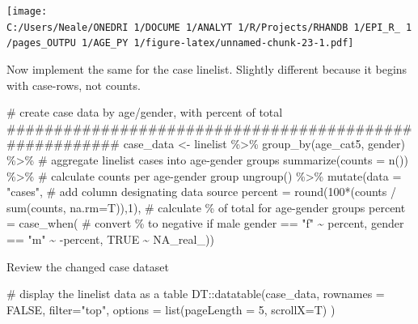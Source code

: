 \documentclass[
]{article}
\newenvironment{Shaded}{\begin{snugshade}}{\end{snugshade}}
\newcommand{\CommentTok}[1]{\textcolor[rgb]{0.50,0.62,0.50}{#1}}
\newcommand{\DataTypeTok}[1]{\textcolor[rgb]{0.87,0.87,0.75}{#1}}
\newcommand{\DecValTok}[1]{\textcolor[rgb]{0.86,0.86,0.80}{#1}}
\newcommand{\KeywordTok}[1]{\textcolor[rgb]{0.94,0.87,0.69}{#1}}
\newcommand{\NormalTok}[1]{\textcolor[rgb]{0.80,0.80,0.80}{#1}}
\newcommand{\OperatorTok}[1]{\textcolor[rgb]{0.94,0.94,0.82}{#1}}
\newcommand{\OtherTok}[1]{\textcolor[rgb]{0.94,0.94,0.56}{#1}}
\newcommand{\StringTok}[1]{\textcolor[rgb]{0.80,0.58,0.58}{#1}}
\begin{document}
\texttt{[image: C:/Users/Neale/ONEDRI~1/DOCUME~1/ANALYT~1/R/Projects/RHANDB~1/EPI\_R\_~1/pages\_OUTPU~1/AGE\_PY~1/figure-latex/unnamed-chunk-23-1.pdf]}

Now implement the same for the case linelist. Slightly different because
it begins with case-rows, not counts.

\begin{Shaded}
\begin{Highlighting}[]
\CommentTok{\# create case data by age/gender, with percent of total}
\CommentTok{\#\#\#\#\#\#\#\#\#\#\#\#\#\#\#\#\#\#\#\#\#\#\#\#\#\#\#\#\#\#\#\#\#\#\#\#\#\#\#\#\#\#\#\#\#\#\#\#\#\#\#\#\#\#\#}
\NormalTok{case\_data \textless{}{-}}\StringTok{ }\NormalTok{linelist }\OperatorTok{\%\textgreater{}\%}
\StringTok{  }\KeywordTok{group\_by}\NormalTok{(age\_cat5, gender) }\OperatorTok{\%\textgreater{}\%}\StringTok{  }\CommentTok{\# aggregate linelist cases into age{-}gender groups}
\StringTok{  }\KeywordTok{summarize}\NormalTok{(}\DataTypeTok{counts =} \KeywordTok{n}\NormalTok{()) }\OperatorTok{\%\textgreater{}\%}\StringTok{     }\CommentTok{\# calculate counts per age{-}gender group}
\StringTok{  }\KeywordTok{ungroup}\NormalTok{() }\OperatorTok{\%\textgreater{}\%}\StringTok{ }
\StringTok{  }\KeywordTok{mutate}\NormalTok{(}\DataTypeTok{data =} \StringTok{"cases"}\NormalTok{,                                          }\CommentTok{\# add column designating data source}
         \DataTypeTok{percent =} \KeywordTok{round}\NormalTok{(}\DecValTok{100}\OperatorTok{*}\NormalTok{(counts }\OperatorTok{/}\StringTok{ }\KeywordTok{sum}\NormalTok{(counts, }\DataTypeTok{na.rm=}\NormalTok{T)),}\DecValTok{1}\NormalTok{),  }\CommentTok{\# calculate \% of total for age{-}gender groups}
         \DataTypeTok{percent =} \KeywordTok{case\_when}\NormalTok{(                                     }\CommentTok{\# convert \% to negative if male}
\NormalTok{            gender }\OperatorTok{==}\StringTok{ "f"} \OperatorTok{\textasciitilde{}}\StringTok{ }\NormalTok{percent,}
\NormalTok{            gender }\OperatorTok{==}\StringTok{ "m"} \OperatorTok{\textasciitilde{}}\StringTok{ }\OperatorTok{{-}}\NormalTok{percent,}
            \OtherTok{TRUE}          \OperatorTok{\textasciitilde{}}\StringTok{ }\OtherTok{NA\_real\_}\NormalTok{))}
\end{Highlighting}
\end{Shaded}

Review the changed case dataset

\begin{Shaded}
\begin{Highlighting}[]
\CommentTok{\# display the linelist data as a table}
\NormalTok{DT}\OperatorTok{::}\KeywordTok{datatable}\NormalTok{(case\_data, }\DataTypeTok{rownames =} \OtherTok{FALSE}\NormalTok{, }\DataTypeTok{filter=}\StringTok{"top"}\NormalTok{, }\DataTypeTok{options =} \KeywordTok{list}\NormalTok{(}\DataTypeTok{pageLength =} \DecValTok{5}\NormalTok{, }\DataTypeTok{scrollX=}\NormalTok{T) )}
\end{Highlighting}
\end{Shaded}
\end{document}
